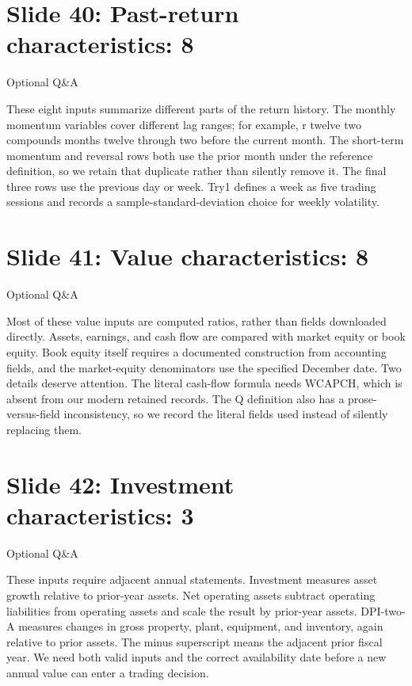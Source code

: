\documentclass[11pt]{article}
\begin{document}
\section*{Slide 40: Past-return characteristics: 8}

\textcolor{SBred}{Optional Q\&A}

These eight inputs summarize different parts of the return history. The monthly momentum variables cover different lag ranges; for example, r twelve two compounds months twelve through two before the current month. The short-term momentum and reversal rows both use the prior month under the reference definition, so we retain that duplicate rather than silently remove it. The final three rows use the previous day or week. Try1 defines a week as five trading sessions and records a sample-standard-deviation choice for weekly volatility.

\section*{Slide 41: Value characteristics: 8}

\textcolor{SBred}{Optional Q\&A}

Most of these value inputs are computed ratios, rather than fields downloaded directly. Assets, earnings, and cash flow are compared with market equity or book equity. Book equity itself requires a documented construction from accounting fields, and the market-equity denominators use the specified December date. Two details deserve attention. The literal cash-flow formula needs WCAPCH, which is absent from our modern retained records. The Q definition also has a prose-versus-field inconsistency, so we record the literal fields used instead of silently replacing them.

\section*{Slide 42: Investment characteristics: 3}

\textcolor{SBred}{Optional Q\&A}

These inputs require adjacent annual statements. Investment measures asset growth relative to prior-year assets. Net operating assets subtract operating liabilities from operating assets and scale the result by prior-year assets. DPI-two-A measures changes in gross property, plant, equipment, and inventory, again relative to prior assets. The minus superscript means the adjacent prior fiscal year. We need both valid inputs and the correct availability date before a new annual value can enter a trading decision.
\end{document}
